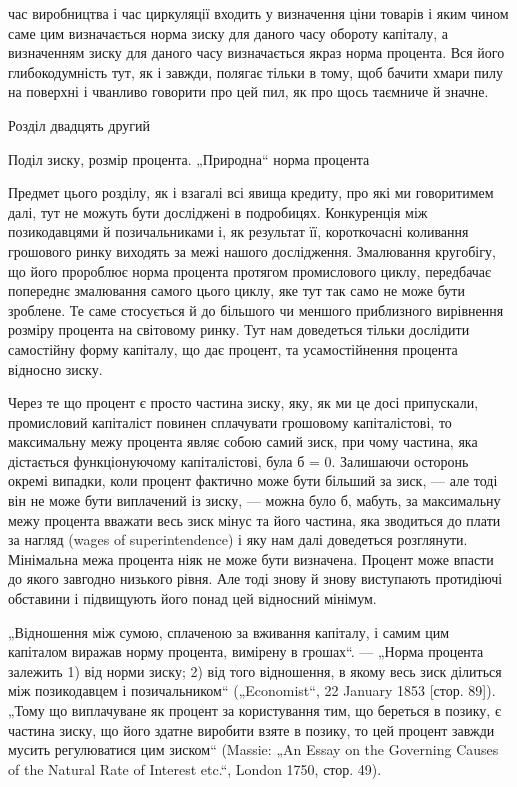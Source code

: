 \parcont{}  %
час виробництва і час циркуляції входить у визначення ціни
товарів і яким чином саме цим визначається норма зиску для
даного часу обороту капіталу, а визначенням зиску для даного
часу визначається якраз норма процента. Вся його глибокодумність
тут, як і завжди, полягає тільки в тому, щоб бачити хмари
пилу на поверхні і чванливо говорити про цей пил, як про щось
таємниче й значне.

Розділ двадцять другий

Поділ зиску, розмір процента. „Природна“ норма
процента

Предмет цього розділу, як і взагалі всі явища кредиту, про
які ми говоритимем далі, тут не можуть бути досліджені в подробицях.
Конкуренція між позикодавцями й позичальниками і,
як результат її, короткочасні коливання грошового ринку виходять
за межі нашого дослідження. Змалювання кругобігу, що
його пророблює норма процента протягом промислового циклу,
передбачає попереднє змалювання самого цього циклу, яке тут
так само не може бути зроблене. Те саме стосується й до більшого
чи меншого приблизного вирівнення розміру процента
на світовому ринку. Тут нам доведеться тільки дослідити самостійну
форму капіталу, що дає процент, та усамостійнення процента
відносно зиску.

Через те що процент є просто частина зиску, яку, як ми
це досі припускали, промисловий капіталіст повинен сплачувати
грошовому капіталістові, то максимальну межу процента
являє собою самий зиск, при чому частина, яка дістається функціонуючому
капіталістові, була б = 0. Залишаючи осторонь окремі
випадки, коли процент фактично може бути більший за зиск, —
але тоді він не може бути виплачений із зиску, — можна було б,
мабуть, за максимальну межу процента вважати весь зиск мінус
та його частина, яка зводиться до плати за нагляд (wages
of superintendence) і яку нам далі доведеться розглянути. Мінімальна
межа процента ніяк не може бути визначена. Процент
може впасти до якого завгодно низького рівня. Але тоді знову
й знову виступають протидіючі обставини і підвищують його
понад цей відносний мінімум.

„Відношення між сумою, сплаченою за вживання капіталу,
і самим цим капіталом виражав норму процента, вимірену в
грошах“. — „Норма процента залежить 1) від норми зиску; 2) від
того відношення, в якому весь зиск ділиться між позикодавцем
і позичальником“ („Economist“, 22 January 1853 [стор. 89]). „Тому
що виплачуване як процент за користування тим, що береться в
позику, є частина зиску, що його здатне виробити взяте в позику,
то цей процент завжди мусить регулюватися цим зиском“
(Massie: „An Essay on the Governing Causes of the Natural Rate of
Interest etc.“, London 1750, стор. 49).
